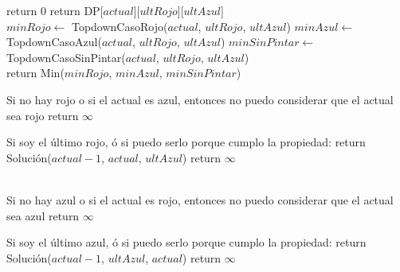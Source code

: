 \begin{algorithm}[H]
\begin{algorithmic}
        return $0$
    \EndIf
        return DP[$actual$][$ultRojo$][$ultAzul$]
    \EndIf \\

    \State $minRojo \gets$ TopdownCasoRojo($actual$, $ultRojo$, $ultAzul$)
    \State $minAzul \gets$ TopdownCasoAzul($actual$, $ultRojo$, $ultAzul$)
    \State $minSinPintar \gets$ TopdownCasoSinPintar($actual$, $ultRojo$, $ultAzul$) \\

    \State return Min($minRojo$, $minAzul$, $minSinPintar$)
\EndProcedure
\end{algorithmic}
\end{algorithm} 


\begin{algorithm}[H]
\begin{algorithmic}
    \Comment Si no hay rojo o si el actual es azul, entonces no puedo considerar que el actual sea rojo
        \State return $\infty$
    
    \Else \Comment Si soy el último rojo, ó si puedo serlo porque cumplo la propiedad:
            \State return Solución($actual - 1$, $actual$, $ultAzul$)
        \Else 
            \State return $\infty$
        \EndIf 
    \EndIf
\EndProcedure
\end{algorithmic}
\end{algorithm}


\begin{algorithm}[H]
\begin{algorithmic}
 \\ %
    \Comment Si no hay azul o si el actual es rojo, entonces no puedo considerar que el actual sea azul
        \State return $\infty$
    
    \Else \Comment Si soy el último azul, ó si puedo serlo porque cumplo la propiedad:
            \State return Solución($actual - 1$, $ultAzul$, $actual$)
        \Else 
            \State return $\infty$
        \EndIf 
    \EndIf
\EndProcedure
\end{algorithmic}
\end{algorithm} 


